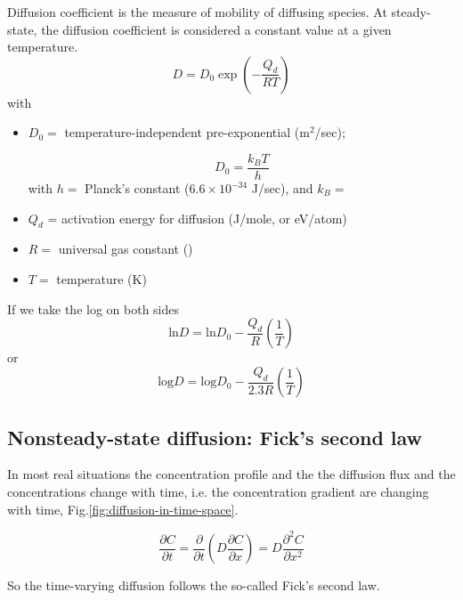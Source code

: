 Diffusion coefficient is the measure of mobility of diffusing species.
At steady-state, the diffusion coefficient is considered a constant value at a
given temperature.
\begin{equation}
D = D_0 \exp \left( - \frac{Q_d}{RT} \right)
\end{equation}
with 
\begin{itemize}
  \item  $D_0 =$ temperature-independent pre-exponential (m$^2$/sec);

\begin{equation}
D_0 = \frac{k_BT}{h}
\end{equation}  
with $h = $ Planck's constant ($6.6 \times 10^{-34}$ J/sec), and $k_B = $
  
  \item $Q_d$ = activation energy for diffusion (J/mole, or eV/atom)
  
  \item $R = $ universal gas constant ()
  
  \item $T = $ temperature (K)
\end{itemize}
If we take the log on both sides
\def\ln{{\text{ln}}}
\begin{equation}
\ln D = \ln D_0 - \frac{Q_d}{R} \left( \frac{1}{T} \right)
\end{equation}
or
\def\log{{\text{log}}}
\begin{equation}
\log D = \log D_0 -\frac{Q_d}{2.3 R} \left( \frac{1}{T} \right)
\end{equation}

\subsection{Nonsteady-state diffusion: Fick's second law}


In most real situations the concentration profile and the the diffusion flux and
the concentrations change with time, i.e. the concentration gradient are
changing with time, Fig.\ref{fig:diffusion-in-time-space}.

\begin{equation}
\frac{\partial C}{\partial t} = \frac{\partial}{\partial t}\left( D
\frac{\partial C}{\partial x} \right) = D \frac{\partial^2 C}{\partial x^2}
\end{equation}

So the time-varying diffusion follows the so-called Fick's second law.

